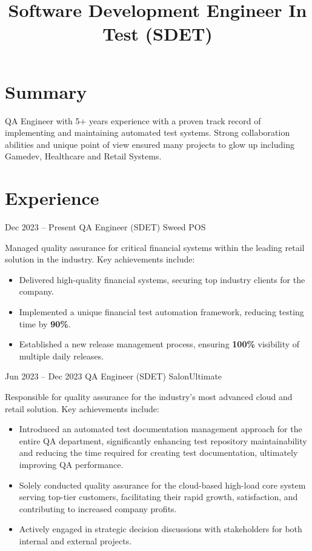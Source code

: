\documentclass[11pt,a4paper,sans]{moderncv}
\title{Software Development Engineer In Test (SDET)}
\begin{document}
\makecvtitle
\vspace{-5mm}
\section{Summary}
QA Engineer with 5+ years experience with a proven track record of implementing and maintaining automated test systems. Strong collaboration abilities and unique point of view ensured many projects to glow up including Gamedev, Healthcare and Retail Systems.

\section{Experience}

\cventry
{Dec 2023 -- Present}
{QA Engineer (SDET)}
{Sweed POS}
{}{}
{Managed quality assurance for critical financial systems within the leading retail solution in the industry. Key achievements include:
\begin{itemize}
\item Delivered high-quality financial systems, securing top industry clients for the company.
\item Implemented a unique financial test automation framework, reducing testing time by \textbf{90\%}.
\item Established a new release management process, ensuring \textbf{100\%} visibility of multiple daily releases.
\end{itemize}}

\cventry
{Jun 2023 -- Dec 2023}
{QA Engineer (SDET)}
{SalonUltimate}
{}{}
{Responsible for quality assurance for the industry's most advanced cloud and retail solution. Key achievements include:
\begin{itemize}
\item Introduced an automated test documentation management approach for the entire QA department, significantly enhancing test repository maintainability and reducing the time required for creating test documentation, ultimately improving QA performance.
\item Solely conducted quality assurance for the cloud-based high-load core system serving top-tier customers, facilitating their rapid growth, satisfaction, and contributing to increased company profits.
\item Actively engaged in strategic decision discussions with stakeholders for both internal and external projects.
\end{itemize}}
\end{document}
